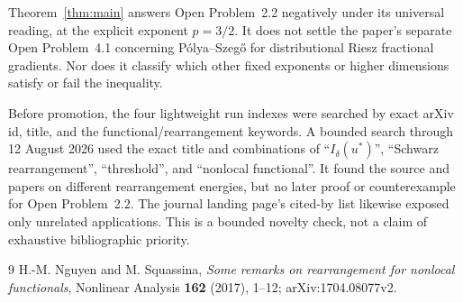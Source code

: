 \documentclass[11pt]{article}
\begin{document}
Theorem~\ref{thm:main} answers Open Problem~2.2 negatively under its universal
reading, at the explicit exponent $p=3/2$.  It does not settle the paper's
separate Open Problem~4.1 concerning P\'olya--Szeg\H{o} for distributional
Riesz fractional gradients.  Nor does it classify which other fixed
exponents or higher dimensions satisfy or fail the inequality.

Before promotion, the four lightweight run indexes were searched by exact
arXiv id, title, and the functional/rearrangement keywords.  A bounded search
through 12 August 2026 used the exact title and combinations of
``$I_\delta(u^*)$'', ``Schwarz rearrangement'', ``threshold'', and
``nonlocal functional''.  It found the source and papers on different
rearrangement energies, but no later proof or counterexample for Open
Problem~2.2.  The journal landing page's cited-by list likewise exposed only
unrelated applications.  This is a bounded novelty check, not a claim of
exhaustive bibliographic priority.

\begin{thebibliography}{9}
H.-M. Nguyen and M. Squassina,
\emph{Some remarks on rearrangement for nonlocal functionals},
Nonlinear Analysis \textbf{162} (2017), 1--12;
arXiv:1704.08077v2.
\end{thebibliography}
\end{document}
